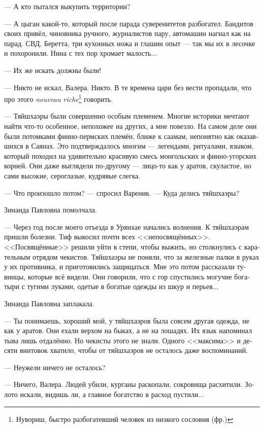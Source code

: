 \documentclass[a5paper,12pt,fleqn]{extbook}\usepackage{cooltooltips}\usepackage{polyglossia}\setdefaultlanguage[babelshorthands=true]{russian}\setotherlanguage{english}\defaultfontfeatures{Ligatures=TeX,Mapping=tex-text} \usepackage{xcolor}\definecolor{lightgray}{HTML}{bbbbbb}\color{lightgray}\newcommand{\ml}[3]{\textenglish{\textcolor{black}{#3}}}
\newcommand{\asterism}{\vspace{1em}{\centering\Large\bfseries$\ast~\ast~\ast$\par}\vspace{1em}}
\newcommand{\textspace}{\vspace{1em}{\centering\Large\bfseries<...>\par}\vspace{1em}}
\begin{document}
--- А кто пытался выкупить территории?

--- А цыган какой-то, который после парада суверенитетов разбогател.
Бандитов своих привёл, чиновника ручного, журналистов пару, автомашин нагнал как на парад.
СВД, Беретта, три кухонных ножа и глашин опыт --- так мы их в лесочке и похоронили.
Нина с тех пор хромает малость...

--- Их же искать должны были!

--- Никто не искал, Валера.
Никто.
В те времена цари без вести пропадали, что про этого \textit{nouveau riche}\footnote{Нувориш, быстро разбогатевший человек из низкого сословия (фр.)} говорить.

\asterism

\textspace

--- Тяйшхаэры были совершенно особым племенем.
Многие историки мечтают найти что-то особенное, непохожее на других, а мне повезло.
На самом деле они были потомками финно-пермских племён, ближе к саамам, непонятно как оказавшихся в Саянах.
Это подтверждалось многим --- легендами, ритуалами, языком, который походил на удивительно красивую смесь монгольских и финно-угорских корней.
Они даже выглядели по-другому --- лицо-то как у аратов, скуластое, но сами высокие, сероглазые, кудрявые слегка.

--- Что произошло потом? --- спросил Вареник.
--- Куда делись тяйшхаэры?

Зинаида Павловна помолчала.

--- Через год после моего отъезда в Урянхае начались волнения.
К тяйшхаэрам пришли болезни.
Тиф выкосил почти всех <<непосвящённых>>.
<<Посвящённые>> решили уйти в степи, чтобы выжить, но столкнулись с карательным отрядом чекистов.
Тяйшхаэры не поняли, что за железные палки в руках у их противника, и приготовились защищаться.
Мне это потом рассказали тувинцы, которые всё видели.
Они говорили, что с гор спустились могучие богатыри с тугими луками, одетые в богатые одежды из шкур и перьев...

Зинаида Павловна заплакала.

--- Ты понимаешь, хороший мой, у тяйшхаэров была совсем другая одежда, не как у аратов.
Они ехали верхом на быках, а не на лошадях.
Их язык напоминал тыва лишь отдалённо.
Но чекисты этого не знали.
Одного <<максима>> и десяти винтовок хватило, чтобы от тяйшхаэров не осталось даже воспоминаний.

--- Неужели ничего не осталось?

--- Ничего, Валера.
Людей убили, курганы раскопали, сокровища расхитили.
Золото искали, видишь ли, а главное богатство в расход пустили...
\end{document}
